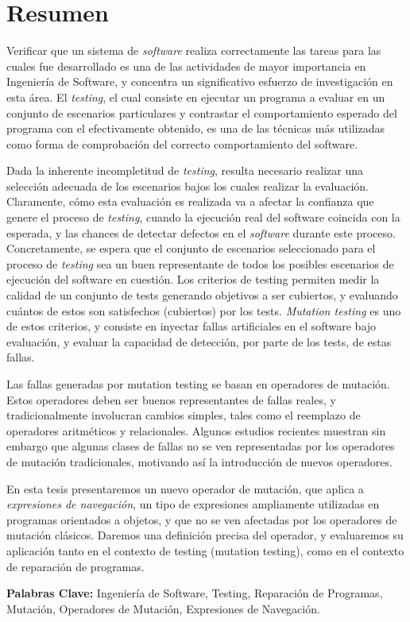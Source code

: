 \chapter*{Resumen}

Verificar que un sistema de \emph{software} realiza correctamente las tareas para las cuales fue desarrollado es una de las actividades de mayor importancia en Ingenier\'ia de Software, y concentra un significativo esfuerzo de investigaci\'on en esta \'area. El \emph{testing}, el cual consiste en ejecutar un programa a evaluar en un conjunto de escenarios particulares y contrastar el comportamiento esperado del programa con el efectivamente obtenido, es una de las t\'ecnicas m\'as utilizadas como forma de comprobaci\'on del correcto comportamiento del software.

Dada la inherente incompletitud de \emph{testing}, resulta necesario realizar una selecci\'on adecuada de los escenarios bajos los cuales realizar la evaluaci\'on. Claramente, c\'omo esta evaluaci\'on es realizada va a afectar la confianza que genere el proceso de \emph{testing}, cuando la ejecuci\'on real del software coincida con la esperada, y las chances de detectar defectos en el \emph{software} durante este proceso. Concretamente, se espera que el conjunto de escenarios seleccionado para el proceso de \emph{testing} sea un buen representante de todos los posibles escenarios de ejecuci\'on del software en cuesti\'on. Los criterios de testing permiten medir la calidad de un conjunto de tests generando objetivos a ser cubiertos, y evaluando cu\'antos de estos son satisfechos (cubiertos) por los tests. \emph{Mutation testing} es uno de estos criterios, y consiste en inyectar fallas artificiales en el software bajo evaluaci\'on, y evaluar la capacidad de detecci\'on, por parte de los tests, de estas fallas.

Las fallas generadas por mutation testing se basan en operadores de mutaci\'on. Estos operadores deben ser buenos representantes de fallas reales, y tradicionalmente involucran cambios simples, tales como el reemplazo de operadores aritm\'eticos y relacionales. Algunos estudios recientes muestran sin embargo que algunas clases de fallas no se ven representadas por los operadores de mutaci\'on tradicionales, motivando as\'i la introducci\'on de nuevos operadores. 

En esta tesis presentaremos un nuevo operador de mutaci\'on, que aplica a \emph{expresiones de navegaci\'on}, un tipo de expresiones ampliamente utilizadas en programas orientados a objetos, y que no se ven afectadas por los operadores de mutaci\'on cl\'asicos. Daremos una definici\'on precisa del operador, y evaluaremos su aplicaci\'on tanto en el contexto de testing (mutation testing), como en el contexto de reparaci\'on de programas. 

\noindent
\textbf{Palabras Clave:} Ingenier\'ia de Software, Testing, Reparaci\'on de Programas, Mutaci\'on, Operadores de Mutaci\'on, Expresiones de Navegaci\'on.






